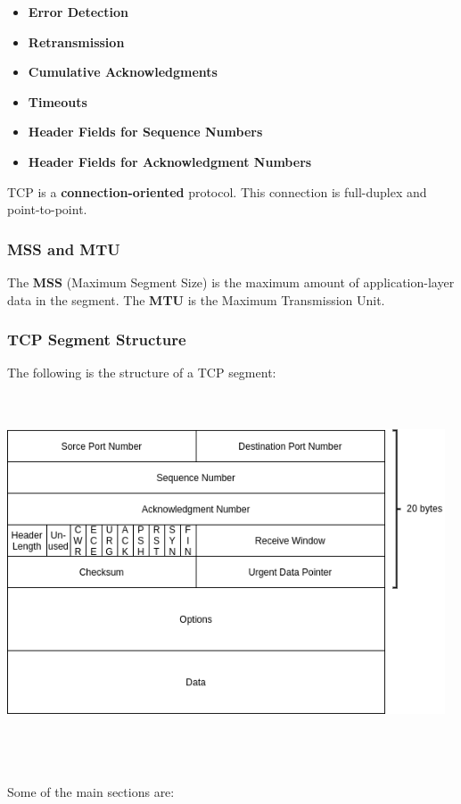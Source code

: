 \documentclass{article}
\begin{document}
\begin{itemize}
	\item \textbf{Error Detection}
	\item \textbf{Retransmission}
	\item \textbf{Cumulative Acknowledgments}
	\item \textbf{Timeouts}
	\item \textbf{Header Fields for Sequence Numbers}
	\item \textbf{Header Fields for Acknowledgment Numbers}
\end{itemize}
TCP is a \textbf{connection-oriented} protocol. This connection is full-duplex and point-to-point.

\subsubsection{MSS and MTU}
The \textbf{MSS} (Maximum Segment Size) is the maximum amount of application-layer data in the segment. The \textbf{MTU} is the Maximum Transmission Unit.

\subsubsection{TCP Segment Structure}
The following is the structure of a TCP segment: \\ \\ \\
\centerline{\includegraphics[width=13cm]{./assets/tcp.png}} \\ \\ \\
Some of the main sections are:
\end{document}
